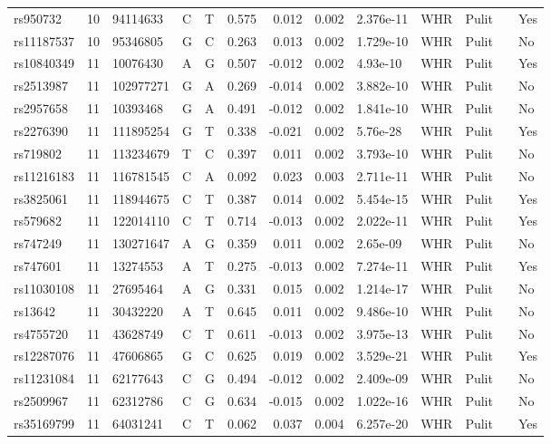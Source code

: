 \documentclass[11pt,twoside]{bristolthesis}
\begin{document}
\begin{longtable}[t]{lrlllrrrlllll}
\addlinespace
rs950732 & 10 & 94114633 & C & T & 0.575 & 0.012 & 0.002 & 2.376e-11 & WHR & Pulit &  & Yes\\
rs11187537 & 10 & 95346805 & G & C & 0.263 & 0.013 & 0.002 & 1.729e-10 & WHR & Pulit &  & No\\
rs10840349 & 11 & 10076430 & A & G & 0.507 & -0.012 & 0.002 & 4.93e-10 & WHR & Pulit &  & Yes\\
rs2513987 & 11 & 102977271 & G & A & 0.269 & -0.014 & 0.002 & 3.882e-10 & WHR & Pulit &  & No\\
rs2957658 & 11 & 10393468 & G & A & 0.491 & -0.012 & 0.002 & 1.841e-10 & WHR & Pulit &  & No\\
\addlinespace
rs2276390 & 11 & 111895254 & G & T & 0.338 & -0.021 & 0.002 & 5.76e-28 & WHR & Pulit &  & Yes\\
rs719802 & 11 & 113234679 & T & C & 0.397 & 0.011 & 0.002 & 3.793e-10 & WHR & Pulit &  & No\\
rs11216183 & 11 & 116781545 & C & A & 0.092 & 0.023 & 0.003 & 2.711e-11 & WHR & Pulit &  & No\\
rs3825061 & 11 & 118944675 & C & T & 0.387 & 0.014 & 0.002 & 5.454e-15 & WHR & Pulit &  & Yes\\
rs579682 & 11 & 122014110 & C & T & 0.714 & -0.013 & 0.002 & 2.022e-11 & WHR & Pulit &  & Yes\\
\addlinespace
rs747249 & 11 & 130271647 & A & G & 0.359 & 0.011 & 0.002 & 2.65e-09 & WHR & Pulit &  & No\\
rs747601 & 11 & 13274553 & A & T & 0.275 & -0.013 & 0.002 & 7.274e-11 & WHR & Pulit &  & Yes\\
rs11030108 & 11 & 27695464 & A & G & 0.331 & 0.015 & 0.002 & 1.214e-17 & WHR & Pulit &  & No\\
rs13642 & 11 & 30432220 & A & T & 0.645 & 0.011 & 0.002 & 9.486e-10 & WHR & Pulit &  & No\\
rs4755720 & 11 & 43628749 & C & T & 0.611 & -0.013 & 0.002 & 3.975e-13 & WHR & Pulit &  & No\\
\addlinespace
rs12287076 & 11 & 47606865 & G & C & 0.625 & 0.019 & 0.002 & 3.529e-21 & WHR & Pulit &  & Yes\\
rs11231084 & 11 & 62177643 & C & G & 0.494 & -0.012 & 0.002 & 2.409e-09 & WHR & Pulit &  & No\\
rs2509967 & 11 & 62312786 & C & G & 0.634 & -0.015 & 0.002 & 1.022e-16 & WHR & Pulit &  & No\\
rs35169799 & 11 & 64031241 & C & T & 0.062 & 0.037 & 0.004 & 6.257e-20 & WHR & Pulit &  & Yes\\

\end{longtable}
\end{document}
